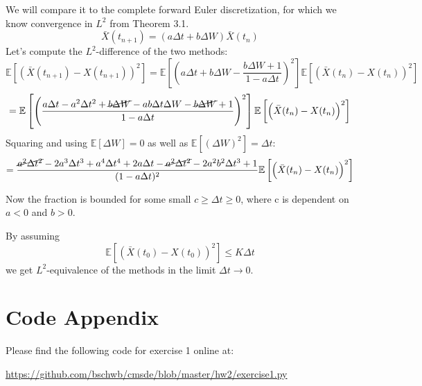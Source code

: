 \documentclass[a4paper,11pt]{scrartcl}
\newcommand*{\Xb}{\bar{X}}
\newcommand*{\D}{\Delta}
\newcommand*{\E}{\mathbb{E}}
\newcommand*{\EV}[1]{\E\left[{#1}\right]}
\newcommand*{\Lt}[1]{\EV{\left({#1}\right)^2}}
\begin{document}
\begin{enumerate}[leftmargin=0em]
\begin{enumerate}[leftmargin=1em]
  We will compare it to the complete forward Euler discretization, for which we
  know convergence in $L^2$ from Theorem 3.1.
  \[\Xb(t_{n+1}) = (a \D t + b \D W) \Xb(t_n)\]
  Let's compute the $L^2$-difference of the two methods:
  \[\Lt{\Xb(t_{n+1}) - X(t_{n+1})} = \Lt{a \D t + b \D W - \frac{b \D W + 1}{1 - a \D t}}
    \Lt{\Xb(t_{n}) - X(t_n)} \]
  \[ = \Lt{\frac{a \D t - a^2 \D t^2 +\cancel{b \D W} - a b \D t \D W -\cancel{b \D
       W} + 1}{1 - a \D t}}
    \Lt{\Xb(t_{n}) - X(t_n)} \]
  Squaring and using $\EV{\D W} = 0$ as well as $\EV{(\D W)^2} = \D t$:
  \[ = \frac{\cancel{a^2 \D t^2} - 2 a^3 \D t^3 + a^4 \D t^4 +
     2 a \D t -\cancel{a^2 \D t^2} -2 a^2 b^2 \D t^3 + 1}{(1 - a \D t)^2}
     \Lt{\Xb(t_n) - X(t_n)}
  \]

Now the fraction is bounded for some small $c \geq \D t \geq 0$, where c is
dependent on $a < 0$ and $b > 0$.

By assuming \[ \Lt{\Xb(t_0) - X(t_0)} \leq K \D t \]
we get $L^2$-equivalence of the methods in the limit $\D t \rightarrow 0$.
\end{enumerate}
\end{enumerate}

\section*{Code Appendix}
Please find the following code for exercise 1 online at:

\url{https://github.com/bschwb/cmsde/blob/master/hw2/exercise1.py}


\end{document}
